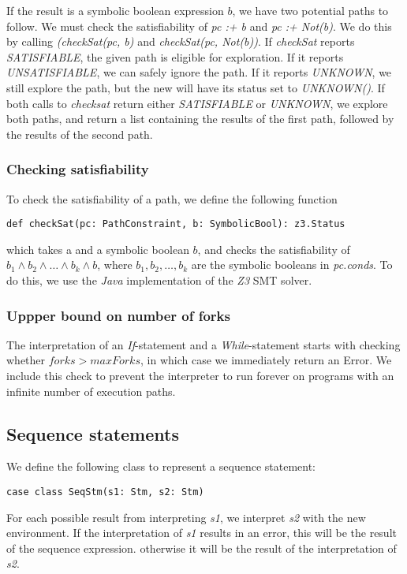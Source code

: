 \noindent If the result is a symbolic boolean expression $b$, we have two potential paths to follow. We must check the satisfiability of \textsl{pc :+ b} and \textsl{pc :+ Not(b)}. We do this by calling \textsl{(checkSat(pc, b)} and \textsl{checkSat(pc, Not(b))}. If \textsl{checkSat} reports \textsl{SATISFIABLE}, the given path is eligible for exploration. If it reports \textsl{UNSATISFIABLE}, we can safely ignore the path. If it reports \textsl{UNKNOWN}, we still explore the path, but the new \pc will have its status set to \textsl{UNKNOWN()}.
 If both calls to \textsl{checksat} return either \textsl{SATISFIABLE} or \textsl{UNKNOWN}, we explore both paths, and return a list containing the results of the first path, followed by the results of the second path.

\subsubsection{Checking satisfiability}
To check the satisfiability of a path, we define the following function

\begin{lstlisting}[style=simple]
def checkSat(pc: PathConstraint, b: SymbolicBool): z3.Status
\end{lstlisting}
which takes a \pc  and a symbolic boolean $b$, and checks the satisfiability of $b_1 \land b_2 \land \ldots \land b_k \land b$, where $b_1, b_2, \ldots, b_k$ are the symbolic booleans in \textsl{pc.conds}. To do this, we use the \textsl{Java} implementation of the \textsl{Z3} SMT solver. 
 
\subsubsection{Uppper bound on number of forks}

The interpretation of an \textsl{If}-statement and a \textsl{While}-statement starts with checking whether $forks > maxForks$, in which case we immediately return an Error. We include this check to prevent the interpreter to run forever on programs with an infinite number of execution paths. 

\iffalse
\subsection{Sequence statements}

We define the following class to represent a sequence statement:
\begin{lstlisting}[style=simple]
	case class SeqStm(s1: Stm, s2: Stm)
\end{lstlisting}
For each possible result from interpreting \textsl{s1}, we interpret \textsl{s2} with the new environment. If the interpretation of \textsl{s1} results in an error, this will be the result of the sequence expression. otherwise it will be the result of the interpretation of \textsl{s2}. 	

